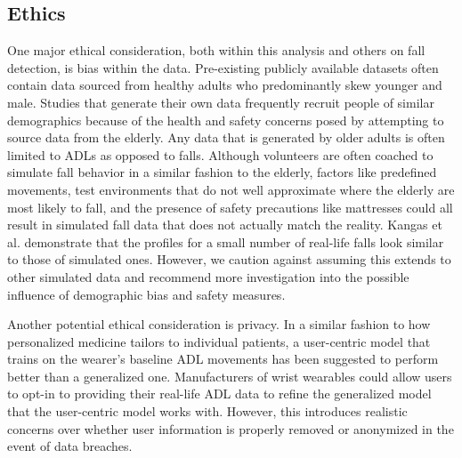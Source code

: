 \documentclass{llncs}
\begin{document}


\subsection{Ethics}

    One major ethical consideration, both within this analysis and others on fall detection, is bias within the data. Pre-existing publicly available datasets often contain data sourced from healthy adults who predominantly skew younger and male.\cite{casilari2017analysis} Studies that generate their own data frequently recruit people of similar demographics because of the health and safety concerns posed by attempting to source data from the elderly.\cite{gjoreski2016accurately} Any data that is generated by older adults is often limited to ADLs as opposed to falls. Although volunteers are often coached to simulate fall behavior in a similar fashion to the elderly, factors like predefined movements, test environments that do not well approximate where the elderly are most likely to fall, and the presence of safety precautions like mattresses could all result in simulated fall data that does not actually match the reality.\cite{casilari2017analysis} Kangas et al. demonstrate that the profiles for a small number of real-life falls look similar to those of simulated ones.\cite{kangas2008comparison} However, we caution against assuming this extends to other simulated data and recommend more investigation into the possible influence of demographic bias and safety measures.
	
	Another potential ethical consideration is privacy. In a similar fashion to how personalized medicine tailors to individual patients, a user-centric model that trains on the wearer's baseline ADL movements has been suggested to perform better than a generalized one.\cite{villar2019online} Manufacturers of wrist wearables could allow users to opt-in to providing their real-life ADL data to refine the generalized model that the user-centric model works with. However, this introduces realistic concerns over whether user information is properly removed or anonymized in the event of data breaches.

    
\end{document}

